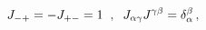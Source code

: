 \begin{equation}\label{J}
J_{-+}=-J_{+-}=1  \hspace{2mm}, \hspace{2mm}
J_{\alpha\gamma}J^{\gamma\beta}=\delta^{\beta}_{\alpha}\,,
\end{equation}

